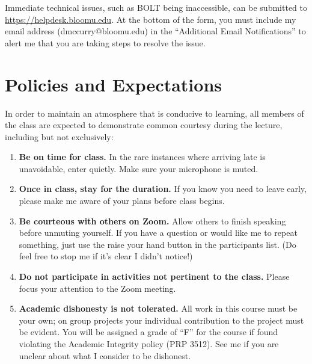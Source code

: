 \documentclass[11pt,letterpaper]{article}
\begin{document}
Immediate technical issues, such as BOLT being inaccessible, can be submitted to
\url{https://helpdesk.bloomu.edu}. At the bottom of the form, you must include
my email address (dmccurry@bloomu.edu) in the ``Additional Email Notifications''
to alert me that you are taking steps to resolve the issue.

\section{Policies and Expectations}
In order to maintain an atmosphere that is conducive to learning, all members
of the class are expected to demonstrate common courtesy during the lecture,
including but not exclusively:
\begin{enumerate}
	\item \textbf{Be on time for class.} In the rare instances where
		arriving late is unavoidable, enter quietly. Make sure your
		microphone is muted.
	\item \textbf{Once in class, stay for the duration.} If you know you
		need to leave early, please make me aware of your plans before
		class begins.
	\item \textbf{Be courteous with others on Zoom.} Allow others to finish
		speaking before unmuting yourself. If you have a question or
		would like me to repeat something, just use the raise your hand
		button in the participants list. (Do feel free to stop me if
		it's clear I didn't notice!)
	\item \textbf{Do not participate in activities not pertinent to the
		class.} Please focus your attention to the Zoom meeting.
	\item \textbf{Academic dishonesty is not tolerated.} All work in this
		course must be your own; on group projects your individual
		contribution to the project must be evident. You will be
		assigned a grade of ``F'' for the course if found violating the
		Academic Integrity policy (PRP 3512).  See me if you are unclear
		about what I consider to be dishonest.

\end{enumerate}
\end{document}
